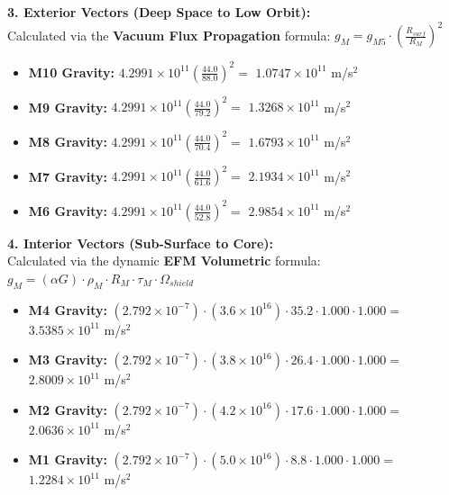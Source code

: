 \documentclass[11pt, a4paper]{article}
\begin{document}
  \clearpage
  \noindent \textbf{3. Exterior Vectors (Deep Space to Low Orbit):} \\
  \hspace*{1em} Calculated via the \textbf{Vacuum Flux Propagation} formula: $g_M = g_{M5} \cdot \left( \frac{R_{surf}}{R_M} \right)^2$
  \begin{itemize}
    \item \textbf{M10 Gravity:} $4.2991 \times 10^{11} \left( \frac{44.0}{88.0} \right)^2 =$ \textbf{$1.0747 \times 10^{11}$} m/s$^2$
    \item \textbf{M9 Gravity:} $4.2991 \times 10^{11} \left( \frac{44.0}{79.2} \right)^2 =$ \textbf{$1.3268 \times 10^{11}$} m/s$^2$
    \item \textbf{M8 Gravity:} $4.2991 \times 10^{11} \left( \frac{44.0}{70.4} \right)^2 =$ \textbf{$1.6793 \times 10^{11}$} m/s$^2$
    \item \textbf{M7 Gravity:} $4.2991 \times 10^{11} \left( \frac{44.0}{61.6} \right)^2 =$ \textbf{$2.1934 \times 10^{11}$} m/s$^2$
    \item \textbf{M6 Gravity:} $4.2991 \times 10^{11} \left( \frac{44.0}{52.8} \right)^2 =$ \textbf{$2.9854 \times 10^{11}$} m/s$^2$
  \end{itemize}

  \vspace{0.5em}
  \noindent \textbf{4. Interior Vectors (Sub-Surface to Core):} \\[0.5em]
  \hspace*{1em} Calculated via the dynamic \textbf{EFM Volumetric} formula: $g_M = (\alpha G) \cdot \rho_{M} \cdot R_M \cdot \tau_M \cdot \Omega_{shield}$
  \begin{itemize}
    \item \textbf{M4 Gravity:} $(2.792 \times 10^{-7}) \cdot (3.6 \times 10^{16}) \cdot 35.2 \cdot 1.000 \cdot 1.000 =$ \textbf{$3.5385 \times 10^{11}$} m/s$^2$
    \item \textbf{M3 Gravity:} $(2.792 \times 10^{-7}) \cdot (3.8 \times 10^{16}) \cdot 26.4 \cdot 1.000 \cdot 1.000 =$ \textbf{$2.8009 \times 10^{11}$} m/s$^2$
    \item \textbf{M2 Gravity:} $(2.792 \times 10^{-7}) \cdot (4.2 \times 10^{16}) \cdot 17.6 \cdot 1.000 \cdot 1.000 =$ \textbf{$2.0636 \times 10^{11}$} m/s$^2$
    \item \textbf{M1 Gravity:} $(2.792 \times 10^{-7}) \cdot (5.0 \times 10^{16}) \cdot 8.8 \cdot 1.000 \cdot 1.000 =$ \textbf{$1.2284 \times 10^{11}$} m/s$^2$
  \end{itemize}
\end{document}

